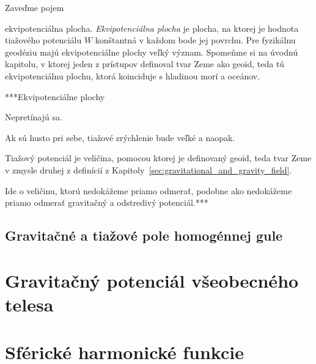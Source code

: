 \documentclass[a4paper, 12pt]{book}
\begin{document}
Zaveďme pojem {ekvipotenciálna plocha.  \emph{Ekvipotenciálna plocha} je 
plocha, na ktorej je hodnota tiažového potenciálu $W$ konštantná v každom bode 
jej povrchu.  Pre fyzikálnu geodéziu majú ekvipotenciálne plochy veľký význam.  
Spomeňme si na úvodnú kapitolu, v ktorej jeden z prístupov definoval tvar Zeme 
ako geoid, teda tú ekvipotenciálnu plochu, ktorá koinciduje s hladinou morí 
a oceánov.  

***Ekvipotenciálne plochy

Nepretínajú sa.

Ak sú husto pri sebe, tiažové zrýchlenie bude veľké a naopak.

Tiažový potenciál je veličina, pomocou ktorej je definovaný geoid, teda tvar 
Zeme v zmysle druhej z definícií 
z Kapitoly~\ref{sec:gravitational_and_gravity_field}.

Ide o veličinu, ktorú nedokážeme priamo odmerať, podobne ako nedokážeme priamo 
odmerať gravitačný a odstredivý potenciál.***






\section{Gravitačné a tiažové pole homogénnej gule}






\chapter{Gravitačný potenciál všeobecného telesa}








\chapter{Sférické harmonické funkcie}


}
\end{document}
